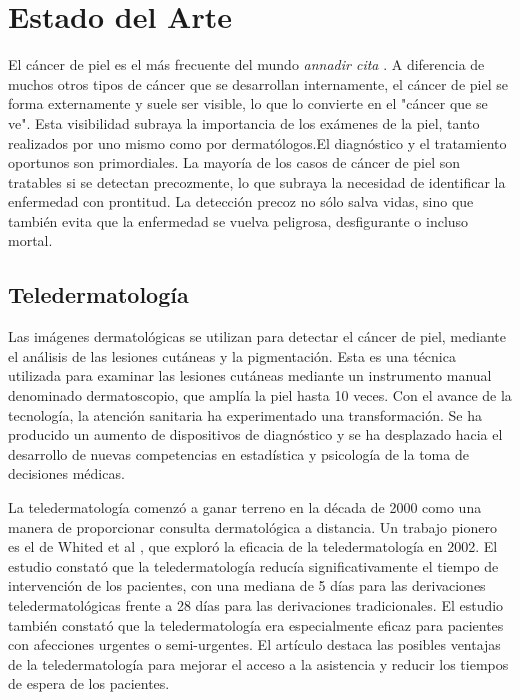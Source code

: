 \chapter{Estado del Arte}\label{chapter:state-of-the-art}

El cáncer de piel es el más frecuente del mundo \textit{annadir cita} . A diferencia de muchos otros tipos de cáncer que se 
desarrollan internamente, el cáncer de piel se forma externamente y suele ser visible, lo que lo convierte en el "cáncer que se ve". Esta visibilidad subraya 
la importancia de los exámenes de la piel, tanto realizados por uno mismo como por dermatólogos.El diagnóstico y el tratamiento oportunos son primordiales. 
La mayoría de los casos de cáncer de piel son tratables si se detectan precozmente, lo que subraya la necesidad de identificar la enfermedad con prontitud. 
La detección precoz no sólo salva vidas, sino que también evita que la enfermedad se vuelva peligrosa, desfigurante o incluso mortal.

\section*{Teledermatología}

Las imágenes dermatológicas se utilizan para detectar el cáncer de piel, mediante el análisis de las lesiones cutáneas y la pigmentación. Esta es una técnica 
utilizada para examinar las lesiones cutáneas mediante un instrumento manual denominado dermatoscopio, que amplía la piel hasta 10 veces. Con el avance de la 
tecnología, la atención sanitaria ha experimentado una transformación. Se ha producido un aumento de dispositivos de diagnóstico y se ha desplazado hacia el 
desarrollo de nuevas competencias en estadística y psicología de la toma de decisiones médicas.

La teledermatología comenzó a ganar terreno en la década de 2000 como una manera de proporcionar consulta dermatológica a distancia. Un trabajo pionero 
es el de Whited et al \cite{whited2002teledermatology}, que exploró la eficacia de la teledermatología en 2002. El estudio constató que la teledermatología 
reducía significativamente el tiempo de intervención de los pacientes, con una mediana de 5 días para las derivaciones teledermatológicas frente a 28 días para 
las derivaciones tradicionales. El estudio también constató que la teledermatología era especialmente eficaz para pacientes con afecciones urgentes o semi-urgentes. 
El artículo destaca las posibles ventajas de la teledermatología para mejorar el acceso a la asistencia y reducir los tiempos de espera de los pacientes.
